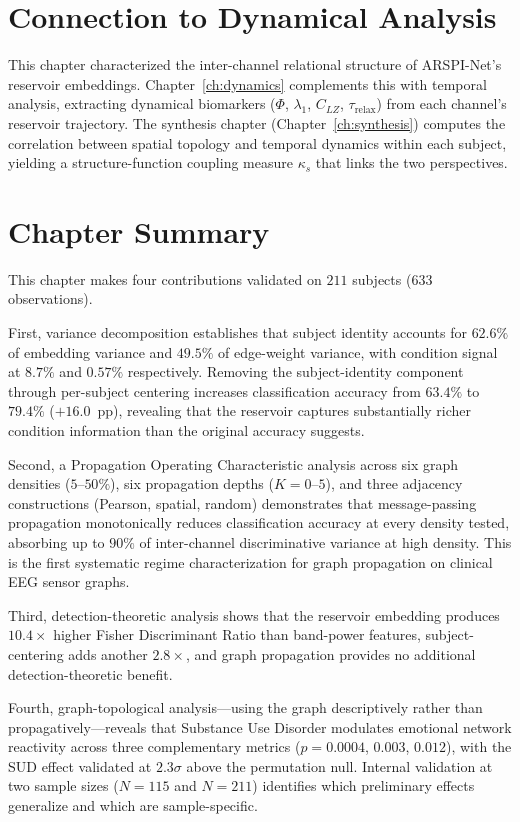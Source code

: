 \section{Connection to Dynamical Analysis}
\label{sec:ch5_bridge}

This chapter characterized the inter-channel relational structure of ARSPI-Net's reservoir embeddings. Chapter~\ref{ch:dynamics} complements this with temporal analysis, extracting dynamical biomarkers ($\Phi$, $\lambda_1$, $C_{LZ}$, $\tau_{\text{relax}}$) from each channel's reservoir trajectory. The synthesis chapter (Chapter~\ref{ch:synthesis}) computes the correlation between spatial topology and temporal dynamics within each subject, yielding a structure-function coupling measure $\kappa_s$ that links the two perspectives.


\section{Chapter Summary}
\label{sec:ch5_summary}

This chapter makes four contributions validated on $211$ subjects ($633$ observations).

First, variance decomposition establishes that subject identity accounts for $62.6\%$ of embedding variance and $49.5\%$ of edge-weight variance, with condition signal at $8.7\%$ and $0.57\%$ respectively. Removing the subject-identity component through per-subject centering increases classification accuracy from $63.4\%$ to $79.4\%$ ($+16.0$~pp), revealing that the reservoir captures substantially richer condition information than the original accuracy suggests.

Second, a Propagation Operating Characteristic analysis across six graph densities ($5$--$50\%$), six propagation depths ($K = 0$--$5$), and three adjacency constructions (Pearson, spatial, random) demonstrates that message-passing propagation monotonically reduces classification accuracy at every density tested, absorbing up to $90\%$ of inter-channel discriminative variance at high density. This is the first systematic regime characterization for graph propagation on clinical EEG sensor graphs.

Third, detection-theoretic analysis shows that the reservoir embedding produces $10.4\times$ higher Fisher Discriminant Ratio than band-power features, subject-centering adds another $2.8\times$, and graph propagation provides no additional detection-theoretic benefit.

Fourth, graph-topological analysis---using the graph descriptively rather than propagatively---reveals that Substance Use Disorder modulates emotional network reactivity across three complementary metrics ($p = 0.0004$, $0.003$, $0.012$), with the SUD effect validated at $2.3\sigma$ above the permutation null. Internal validation at two sample sizes ($N = 115$ and $N = 211$) identifies which preliminary effects generalize and which are sample-specific.
